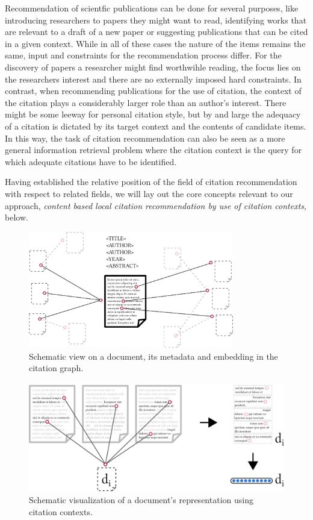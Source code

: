 Recommendation of scientfic publications can be done for several purposes, like introducing researchers to papers they might want to read, identifying works that are relevant to a draft of a new paper or suggesting publications that can be cited in a given context. While in all of these cases the nature of the items remains the same, input and constraints for the recommendation process differ. For the discovery of papers a researcher might find worthwihle reading, the focus lies on the researchers interest and there are no externally imposed hard constraints. In contrast, when recommending publications for the use of citation, the context of the citation plays a considerably larger role than an author's interest. There might be some leeway for personal citation style, but by and large the adequacy of a citation is dictated by its target context and the contents of candidate items. In this way, the task of citation recommendation can also be seen as a more general information retrieval problem where the citation context is the query for which adequate citations have to be identified.

Having established the relative position of the field of citation recommendation with respect to related fields, we will lay out the core concepts relevant to our approach, \emph{content based local citation recommendation by use of citation contexts}, below.

\begin{figure}
  \centering
    \includegraphics[width=0.8\textwidth]{figures/background/document_rich_view.pdf}
  \caption{Schematic view on a document, its metadata and embedding in the citation graph.}
  \label{fig:docrichview}
\end{figure}

\begin{figure}[t]
  \centering
    \includegraphics[width=\textwidth]{figures/background/document_context_view_withvec.pdf}
  \caption{Schematic visualization of a document's representation using citation contexts.}
  \label{fig:doccontview}
\end{figure}

